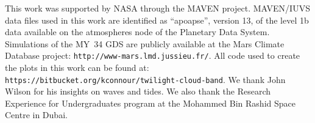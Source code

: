 \documentclass[draft]{agujournal2019}
\begin{document}

%
%
%
%
%
%
%

\acknowledgments
This work was supported by NASA through the MAVEN project. MAVEN/IUVS data files used in this work are identified as ``apoapse'', version 13, of the level 1b data available on the atmospheres node of the Planetary Data System. Simulations of the MY~34 GDS are publicly available at the Mars Climate Database project: \texttt{http://www-mars.lmd.jussieu.fr/}. All code used to create the plots in this work can be found at: \texttt{https://bitbucket.org/kconnour/twilight-cloud-band}. We thank John Wilson for his insights on waves and tides. We also thank the Research Experience for Undergraduates program at the Mohammed Bin Rashid Space Centre in Dubai.


\end{document}
